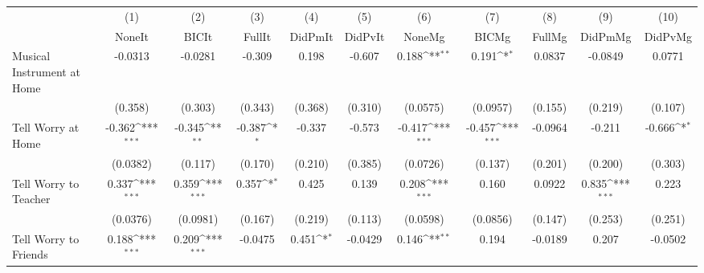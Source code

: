 {
\def\sym#1{\ifmmode^{#1}\else\(^{#1}\)\fi}
\begin{tabular}{l*{10}{c}}
\toprule
            &\multicolumn{1}{c}{(1)}&\multicolumn{1}{c}{(2)}&\multicolumn{1}{c}{(3)}&\multicolumn{1}{c}{(4)}&\multicolumn{1}{c}{(5)}&\multicolumn{1}{c}{(6)}&\multicolumn{1}{c}{(7)}&\multicolumn{1}{c}{(8)}&\multicolumn{1}{c}{(9)}&\multicolumn{1}{c}{(10)}\\
            &\multicolumn{1}{c}{NoneIt}&\multicolumn{1}{c}{BICIt}&\multicolumn{1}{c}{FullIt}&\multicolumn{1}{c}{DidPmIt}&\multicolumn{1}{c}{DidPvIt}&\multicolumn{1}{c}{NoneMg}&\multicolumn{1}{c}{BICMg}&\multicolumn{1}{c}{FullMg}&\multicolumn{1}{c}{DidPmMg}&\multicolumn{1}{c}{DidPvMg}\\
\midrule
Musical Instrument at Home&     -0.0313         &     -0.0281         &      -0.309         &       0.198         &      -0.607         &       0.188\sym{**} &       0.191\sym{*}  &      0.0837         &     -0.0849         &      0.0771         \\
            &     (0.358)         &     (0.303)         &     (0.343)         &     (0.368)         &     (0.310)         &    (0.0575)         &    (0.0957)         &     (0.155)         &     (0.219)         &     (0.107)         \\
\addlinespace
Tell Worry at Home&      -0.362\sym{***}&      -0.345\sym{**} &      -0.387\sym{*}  &      -0.337         &      -0.573         &      -0.417\sym{***}&      -0.457\sym{***}&     -0.0964         &      -0.211         &      -0.666\sym{*}  \\
            &    (0.0382)         &     (0.117)         &     (0.170)         &     (0.210)         &     (0.385)         &    (0.0726)         &     (0.137)         &     (0.201)         &     (0.200)         &     (0.303)         \\
\addlinespace
Tell Worry to Teacher&       0.337\sym{***}&       0.359\sym{***}&       0.357\sym{*}  &       0.425         &       0.139         &       0.208\sym{***}&       0.160         &      0.0922         &       0.835\sym{***}&       0.223         \\
            &    (0.0376)         &    (0.0981)         &     (0.167)         &     (0.219)         &     (0.113)         &    (0.0598)         &    (0.0856)         &     (0.147)         &     (0.253)         &     (0.251)         \\
\addlinespace
Tell Worry to Friends&       0.188\sym{***}&       0.209\sym{***}&     -0.0475         &       0.451\sym{*}  &     -0.0429         &       0.146\sym{**} &       0.194         &     -0.0189         &       0.207         &     -0.0502         \\

\end{tabular}}
